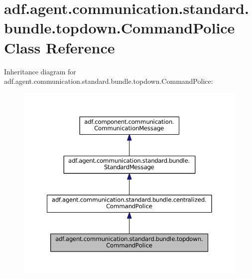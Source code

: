 \hypertarget{classadf_1_1agent_1_1communication_1_1standard_1_1bundle_1_1topdown_1_1CommandPolice}{}\section{adf.\+agent.\+communication.\+standard.\+bundle.\+topdown.\+Command\+Police Class Reference}
\label{classadf_1_1agent_1_1communication_1_1standard_1_1bundle_1_1topdown_1_1CommandPolice}


Inheritance diagram for adf.\+agent.\+communication.\+standard.\+bundle.\+topdown.\+Command\+Police\+:
\nopagebreak
\begin{figure}[H]
\begin{center}
\leavevmode
\includegraphics[width=350pt]{classadf_1_1agent_1_1communication_1_1standard_1_1bundle_1_1topdown_1_1CommandPolice__inherit__graph}
\end{center}
\end{figure}


